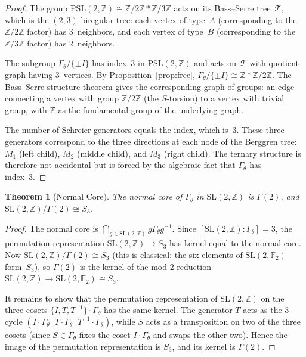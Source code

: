 \documentclass[12pt]{amsart}
\newtheorem{theorem}{Theorem}[section]
\theoremstyle{definition}
\theoremstyle{remark}
\newcommand{\SL}{\mathrm{SL}}
\newcommand{\PSL}{\mathrm{PSL}}
\newcommand{\Z}{\mathbb{Z}}
\newcommand{\Gtheta}{\Gamma_\theta}
\begin{document}
\begin{proof}
The group $\PSL(2,\Z) \cong \Z/2\Z * \Z/3\Z$ acts on its Bass--Serre
tree~$\mathcal{T}$, which is the $(2,3)$-biregular tree: each vertex of
type~$A$ (corresponding to the $\Z/2\Z$ factor) has 3~neighbors, and
each vertex of type~$B$ (corresponding to the $\Z/3\Z$ factor) has
2~neighbors.

The subgroup $\Gtheta/\{\pm I\}$ has index~3 in $\PSL(2,\Z)$ and acts
on~$\mathcal{T}$ with quotient graph having 3~vertices.  By
Proposition~\ref{prop:free}, $\Gtheta/\{\pm I\} \cong \Z * \Z/2\Z$.
The Bass--Serre structure theorem gives the corresponding graph of groups:
an edge connecting a vertex with group $\Z/2\Z$ (the $S$-torsion) to a
vertex with trivial group, with $\Z$ as the fundamental group of the
underlying graph.

The number of Schreier generators equals the index, which is~3.  These
three generators correspond to the three directions at each node of the
Berggren tree: $M_1$ (left child), $M_2$ (middle child), and $M_3$ (right
child).  The ternary structure is therefore not accidental but is forced
by the algebraic fact that $\Gtheta$ has index~3.
\end{proof}

\begin{theorem}[Normal Core]\label{thm:normalcore}
The normal core of\/ $\Gtheta$ in $\SL(2,\Z)$ is $\Gamma(2)$, and
$\SL(2,\Z)/\Gamma(2) \cong S_3$.
\end{theorem}

\begin{proof}
The normal core is $\bigcap_{g \in \SL(2,\Z)} g\Gtheta g^{-1}$.  Since
$[\SL(2,\Z):\Gtheta] = 3$, the permutation representation
$\SL(2,\Z) \to S_3$ has kernel equal to the normal core.  Now
$\SL(2,\Z)/\Gamma(2) \cong S_3$ (this is classical: the six elements
of $\SL(2,\mathbb{F}_2)$ form~$S_3$), so $\Gamma(2)$ is the kernel of
the mod-2 reduction $\SL(2,\Z) \to \SL(2,\mathbb{F}_2) \cong S_3$.

It remains to show that the permutation representation of $\SL(2,\Z)$ on
the three cosets $\{I, T, T^{-1}\}\cdot \Gtheta$ has the same kernel.
The generator $T$ acts as the 3-cycle $(I\cdot\Gtheta \;\; T\cdot\Gtheta
\;\; T^{-1}\cdot\Gtheta)$, while $S$ acts as a transposition on two of
the three cosets (since $S \in \Gtheta$ fixes the coset $I\cdot\Gtheta$
and swaps the other two).  Hence the image of the permutation
representation is $S_3$, and its kernel is $\Gamma(2)$.
\end{proof}
\end{document}
